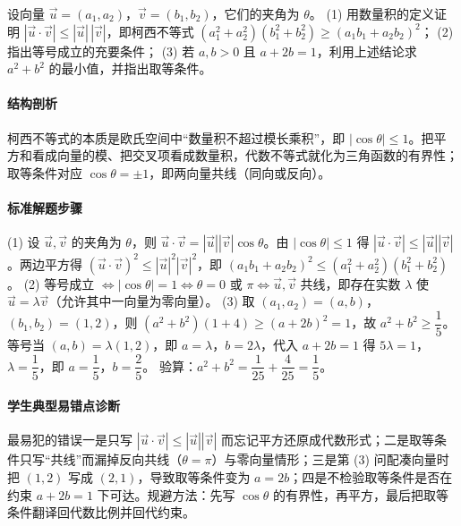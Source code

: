 \begin{problem}
设向量 $\vec u=(a_1,a_2)$，$\vec v=(b_1,b_2)$，它们的夹角为 $\theta$。
(1) 用数量积的定义证明 $|\vec u\cdot\vec v|\le|\vec u|\,|\vec v|$，即柯西不等式
$(a_1^2+a_2^2)(b_1^2+b_2^2)\ge(a_1b_1+a_2b_2)^2$；
(2) 指出等号成立的充要条件；
(3) 若 $a,b>0$ 且 $a+2b=1$，利用上述结论求 $a^2+b^2$ 的最小值，并指出取等条件。
\end{problem}
\begin{solution}
\paragraph{结构剖析}
柯西不等式的本质是欧氏空间中“数量积不超过模长乘积”，即 $|\cos\theta|\le1$。把平方和看成向量的模、把交叉项看成数量积，代数不等式就化为三角函数的有界性；取等条件对应 $\cos\theta=\pm1$，即两向量共线（同向或反向）。
\paragraph{标准解题步骤}
(1) 设 $\vec u,\vec v$ 的夹角为 $\theta$，则 $\vec u\cdot\vec v=|\vec u||\vec v|\cos\theta$。由 $|\cos\theta|\le1$ 得
$|\vec u\cdot\vec v|\le|\vec u||\vec v|$。两边平方得
$(\vec u\cdot\vec v)^2\le|\vec u|^2|\vec v|^2$，即
$(a_1b_1+a_2b_2)^2\le(a_1^2+a_2^2)(b_1^2+b_2^2)$。
(2) 等号成立 $\iff|\cos\theta|=1\iff\theta=0$ 或 $\pi\iff\vec u,\vec v$ 共线，即存在实数 $\lambda$ 使 $\vec u=\lambda\vec v$（允许其中一向量为零向量）。
(3) 取 $(a_1,a_2)=(a,b)$，$(b_1,b_2)=(1,2)$，则
$(a^2+b^2)(1+4)\ge(a+2b)^2=1$，故 $a^2+b^2\ge\dfrac15$。
等号当 $(a,b)=\lambda(1,2)$，即 $a=\lambda$，$b=2\lambda$，代入 $a+2b=1$ 得 $5\lambda=1$，$\lambda=\dfrac15$，即 $a=\dfrac15$，$b=\dfrac25$。
验算：$a^2+b^2=\dfrac1{25}+\dfrac4{25}=\dfrac15$。
\paragraph{学生典型易错点诊断}
最易犯的错误一是只写 $|\vec u\cdot\vec v|\le|\vec u||\vec v|$ 而忘记平方还原成代数形式；二是取等条件只写“共线”而漏掉反向共线（$\theta=\pi$）与零向量情形；三是第 (3) 问配凑向量时把 $(1,2)$ 写成 $(2,1)$，导致取等条件变为 $a=2b$；四是不检验取等条件是否在约束 $a+2b=1$ 下可达。规避方法：先写 $\cos\theta$ 的有界性，再平方，最后把取等条件翻译回代数比例并回代约束。
\end{solution}

